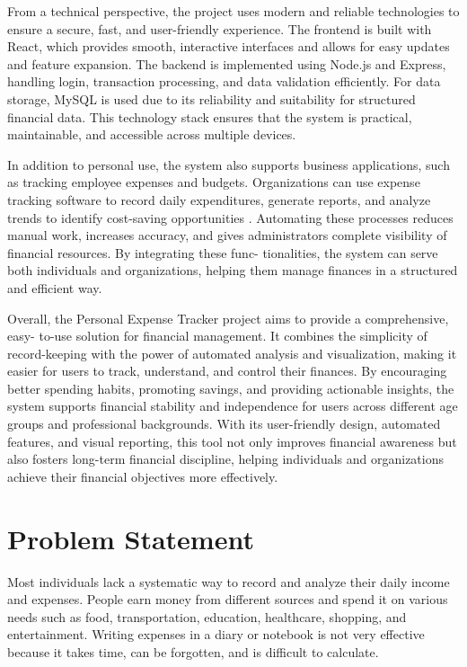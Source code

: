 \documentclass[12pt]{report} %
\begin{document}
\newpage

From a technical perspective, the project uses modern and reliable technologies to ensure
a secure, fast, and user-friendly experience. The frontend is built with React, which provides
smooth, interactive interfaces and allows for easy updates and feature expansion. The
backend is implemented using Node.js and Express, handling login, transaction processing,
and data validation efficiently. For data storage, MySQL is used due to its reliability and
suitability for structured financial data. This technology stack ensures that the system is
practical, maintainable, and accessible across multiple devices.

In addition to personal use, the system also supports business applications, such as
tracking employee expenses and budgets. Organizations can use expense tracking software
to record daily expenditures, generate reports, and analyze trends to identify cost-saving
opportunities \cite{zohoexpense}. Automating these processes reduces manual work, increases accuracy, and
gives administrators complete visibility of financial resources. By integrating these func-
tionalities, the system can serve both individuals and organizations, helping them manage
finances in a structured and efficient way.

Overall, the Personal Expense Tracker project aims to provide a comprehensive, easy-
to-use solution for financial management. It combines the simplicity of record-keeping
with the power of automated analysis and visualization, making it easier for users to
track, understand, and control their finances. By encouraging better spending habits,
promoting savings, and providing actionable insights, the system supports financial stability
and independence for users across different age groups and professional backgrounds. With
its user-friendly design, automated features, and visual reporting, this tool not only improves
financial awareness but also fosters long-term financial discipline, helping individuals and
organizations achieve their financial objectives more effectively.

\newpage
\chapter{Problem Statement}

Most individuals lack a systematic way to record and analyze their daily income and expenses.
People earn money from different sources and spend it on various needs such as food,
transportation, education, healthcare, shopping, and entertainment. Writing expenses in a diary
or notebook is not very effective because it takes time, can be forgotten, and is difficult to
calculate.
\end{document}
